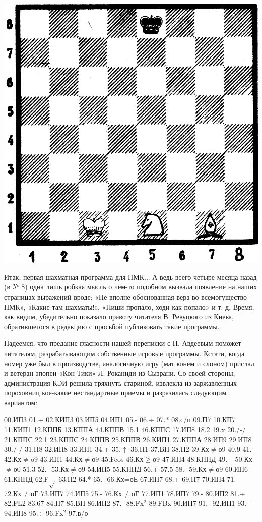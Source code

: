 \documentclass[11pt,a4paper,oneside]{article}
\begin{document}
\includegraphics[width=\textwidth]{mail2}

Итак, первая шахматная программа для ПМК... А ведь всего четыре месяца назад (в № 8) одна лишь робкая мысль о чем-то подобном вызвала появление на наших страницах выражений вроде: «Не вполне обоснованная вера во всемогущество ПМК», «Какие там шахматы!», «Пиши пропало, ходи как попало» и т. д. Время, как видим, убедительно показало правоту читателя В. Ревуцкого из Киева, обратившегося в редакцию с просьбой публиковать такие программы.

Надеемся, что предание гласности нашей переписки с Н. Авдеевым поможет читателям, разрабатывающим собственные игровые программы. Кстати, когда номер уже был в производстве, аналогичную игру (мат конем и слоном) прислал и ветеран эпопеи «Кон-Тики» Л. Роканиди из Сызрани. Со своей стороны, администрация КЭИ решила тряхнуть стариной, извлекла из заржавленных пороховниц кое-какие нестандартные приемы и разразилась следующим вариантом:

00.ИП3 01.$\div$ 02.КИП3 03.ИП5 04.ИП1 05.- 06.$\div$ 07.* 08.с/п 09.П7 10.КП7 11.КИП1 12.КППБ 13.КППА 44.КППВ 15.1 46.КППС 17.ИП8 18.2 19.x 20./-/ 21.КППС 22.1 23.КППС 24.КППВ 25.КППВ 26.КИП1
27.КППА 28.ИП9 29.ИП8 30./-/ 31.П8 32.ИП8 33.ИП1 34.+ 35.$\uparrow$ 36.П1 37.ВП 38.П2 39.Кх$\neq$о9 40.9 41.- 42.Кх$\neq$o9 43.ИП1 44.Кх$\neq$о9 45.Fcos
46.Кх$\geq$о9 47.ИП4 48.КППД 49.+ 50.Кх$\neq$о0 51.3 52.- 53.Кх$\neq$о9 54.ИП5 55.КППД 56.+ 57.5 58.- 59.Кх$\neq$о9 60.ИП6 61.КППД 62.F$\sqrt{}$ 63.П2 64.* 65.- 66.Кх=оЕ 67.ИП7 68.+ 69.П7 70.ИП4 71.- 72.Кх$\neq$оЕ 73.ИП7 74.ИП5 75.- 76.Кх$\neq$оЕ 77.ИП1 78.ИП7 79.- 80.ИП2 81.$\div$ 82.FL2 83.67 84.П7 85.ВП 86.ИП2 87.- 88.Fx$^{2}$ 89.FBx 90.ИП7 91.- 92.ИП1 93.+ 94.ИП8 95.$\div$ 96.Fx$^{2}$ 97.в/о
\end{document}
